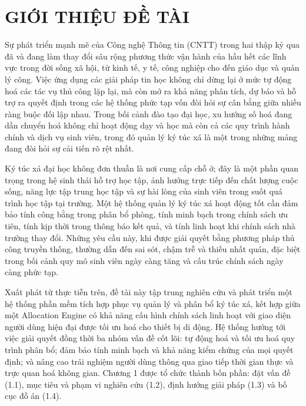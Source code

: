 ﻿\documentclass[a4paper,12pt,openany,oneside]{report}
\begin{document}
\clearpage
\chapter{GIỚI THIỆU ĐỀ TÀI}

Sự phát triển mạnh mẽ của Công nghệ Thông tin (CNTT) trong hai thập kỷ qua đã
và đang làm thay đổi sâu rộng phương thức vận hành của hầu hết các lĩnh vực
trong đời sống xã hội, từ kinh tế, y tế, công nghiệp cho đến giáo dục và quản
lý công. Việc ứng dụng các giải pháp tin học không chỉ dừng lại ở mức tự động
hoá các tác vụ thủ công lặp lại, mà còn mở ra khả năng phân tích, dự báo và hỗ
trợ ra quyết định trong các hệ thống phức tạp vốn đòi hỏi sự cân bằng giữa
nhiều ràng buộc đối lập nhau. Trong bối cảnh đào tạo đại học, xu hướng số hoá
đang dần chuyển hoá không chỉ hoạt động dạy và học mà còn cả các quy trình hành
chính và dịch vụ sinh viên, trong đó quản lý ký túc xá là một trong những mảng
đang đòi hỏi sự cải tiến rõ rệt nhất.

Ký túc xá đại học không đơn thuần là nơi cung cấp chỗ ở; đây là một phần quan
trọng trong hệ sinh thái hỗ trợ học tập, ảnh hưởng trực tiếp đến chất lượng
cuộc sống, năng lực tập trung học tập và sự hài lòng của sinh viên trong suốt
quá trình học tập tại trường. Một hệ thống quản lý ký túc xá hoạt động tốt cần
đảm bảo tính công bằng trong phân bổ phòng, tính minh bạch trong chính sách ưu
tiên, tính kịp thời trong thông báo kết quả, và tính linh hoạt khi chính sách
nhà trường thay đổi. Những yêu cầu này, khi được giải quyết bằng phương pháp
thủ công truyền thống, thường dẫn đến sai sót, chậm trễ và thiếu nhất quán,
đặc biệt trong bối cảnh quy mô sinh viên ngày càng tăng và cấu trúc chính sách
ngày càng phức tạp.

Xuất phát từ thực tiễn trên, đề tài này tập trung nghiên cứu và phát triển một
hệ thống phần mềm tích hợp phục vụ quản lý và phân bổ ký túc xá, kết hợp giữa
một Allocation Engine có khả năng cấu hình chính sách linh hoạt với giao diện
người dùng hiện đại được tối ưu hoá cho thiết bị di động. Hệ thống hướng tới
việc giải quyết đồng thời ba nhóm vấn đề cốt lõi: tự động hoá và tối ưu hoá
quy trình phân bổ; đảm bảo tính minh bạch và khả năng kiểm chứng của mọi quyết
định; và nâng cao trải nghiệm người dùng thông qua giao tiếp thời gian thực và
trực quan hoá không gian. Chương 1 được tổ chức thành bốn phần: đặt vấn đề
(1.1), mục tiêu và phạm vi nghiên cứu (1.2), định hướng giải pháp (1.3) và bố
cục đồ án (1.4).
\end{document}
